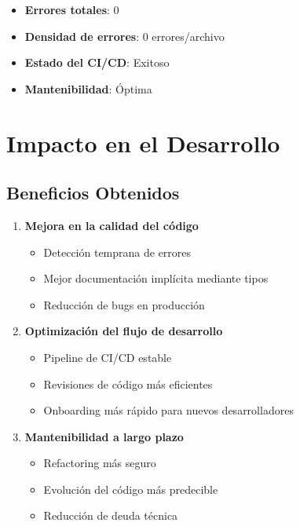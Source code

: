 \documentclass[12pt,a4paper]{article}
\begin{document}
\begin{itemize}
    \item \textbf{Errores totales}: 0
    \item \textbf{Densidad de errores}: 0 errores/archivo
    \item \textbf{Estado del CI/CD}: Exitoso
    \item \textbf{Mantenibilidad}: Óptima
\end{itemize}

\section{Impacto en el Desarrollo}

\subsection{Beneficios Obtenidos}

\begin{enumerate}
    \item \textbf{Mejora en la calidad del código}
    \begin{itemize}
        \item Detección temprana de errores
        \item Mejor documentación implícita mediante tipos
        \item Reducción de bugs en producción
    \end{itemize}

    \item \textbf{Optimización del flujo de desarrollo}
    \begin{itemize}
        \item Pipeline de CI/CD estable
        \item Revisiones de código más eficientes
        \item Onboarding más rápido para nuevos desarrolladores
    \end{itemize}

    \item \textbf{Mantenibilidad a largo plazo}
    \begin{itemize}
        \item Refactoring más seguro
        \item Evolución del código más predecible
        \item Reducción de deuda técnica
    \end{itemize}
\end{enumerate}
\end{document}
